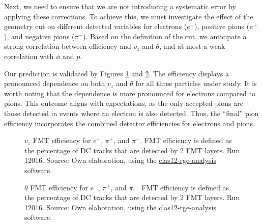     Next, we need to ensure that we are not introducing a systematic error by applying these corrections.
    To achieve this, we must investigate the effect of the geometry cut on different detected variables for electrons ($e^-$), positive pions ($\pi^+$), and negative pions ($\pi^-$).
    Based on the definition of the cut, we anticipate a strong correlation between efficiency and $v_z$ and $\theta$, and at most a weak correlation with $\phi$ and $p$.

    Our prediction is validated by Figures \ref{fig::14.14::fmt_efficiency_vz} and \ref{fig::14.14::fmt_efficiency_theta}.
    The efficiency displays a pronounced dependence on both $v_z$ and $\theta$ for all three particles under study.
    It is worth noting that the dependence is more pronounced for electrons compared to pions.
    This outcome aligns with expectations, as the only accepted pions are those detected in events where an electron is also detected.
    Thus, the ``final'' pion efficiency incorporates the combined detector efficiencies for electrons and pions.

    \begin{figure}[t!]
        \centering{}
        \caption[$v_z$ FMT efficiency for $e^-$, $\pi^+$, and $\pi^-$.
        Run 12016]{$v_z$ FMT efficiency for $e^-$, $\pi^+$, and $\pi^-$.
        FMT efficiency is defined as the percentage of DC tracks that are detected by 2 FMT layers.
        Run 12016.
        Source: Own elaboration, using the \href{https://github.com/bleaktwig/clas12-rge-analysis}{clas12-rge-analysis} software.}
        \label{fig::14.14::fmt_efficiency_vz}
    \end{figure}

    \begin{figure}[t!]
        \centering{}
        \caption[$\theta$ FMT efficiency for $e^-$, $\pi^+$, and $\pi^-$.
        Run 12016]{$\theta$ FMT efficiency for $e^-$, $\pi^+$, and $\pi^-$.
        FMT efficiency is defined as the percentage of DC tracks that are detected by 2 FMT layers.
        Run 12016.
        Source: Own elaboration, using the \href{https://github.com/bleaktwig/clas12-rge-analysis}{clas12-rge-analysis} software.}
        \label{fig::14.14::fmt_efficiency_theta}
    \end{figure}

